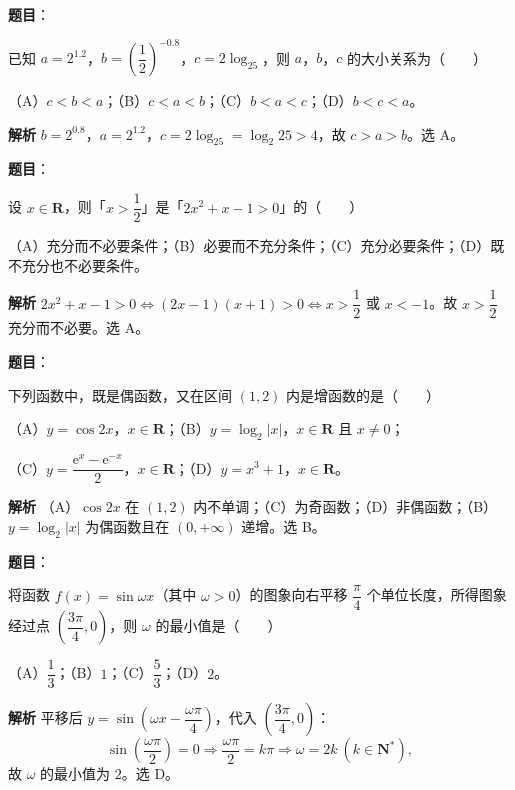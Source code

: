 \begin{answer}

\textbf{题目}：

已知 $a=2^{1.2}$，$b=\left(\dfrac12\right)^{-0.8}$，$c=2\log_25$，则 $a$，$b$，$c$ 的大小关系为\mbox{（　　）}

（A）$c<b<a$；（B）$c<a<b$；（C）$b<a<c$；（D）$b<c<a$。

\textbf{解析}
$b=2^{0.8}$，$a=2^{1.2}$，$c=2\log_25=\log_2 25>4$，故 $c>a>b$。选 A。


\end{answer}
\begin{answer}

\textbf{题目}：

设 $x\in\mathbf R$，则「$x>\dfrac12$」是「$2x^2+x-1>0$」的\mbox{（　　）}

（A）充分而不必要条件；（B）必要而不充分条件；（C）充分必要条件；（D）既不充分也不必要条件。

\textbf{解析}
$2x^2+x-1>0\iff(2x-1)(x+1)>0\iff x>\dfrac12$ 或 $x<-1$。故 $x>\dfrac12$ 充分而不必要。选 A。


\end{answer}
\begin{answer}

\textbf{题目}：

下列函数中，既是偶函数，又在区间 $(1,2)$ 内是增函数的是\mbox{（　　）}

（A）$y=\cos2x$，$x\in\mathbf R$；（B）$y=\log_2|x|$，$x\in\mathbf R$ 且 $x\neq0$；

（C）$y=\dfrac{\mathrm e^x-\mathrm e^{-x}}2$，$x\in\mathbf R$；（D）$y=x^3+1$，$x\in\mathbf R$。

\textbf{解析}
（A）$\cos2x$ 在 $(1,2)$ 内不单调；（C）为奇函数；（D）非偶函数；（B）$y=\log_2|x|$ 为偶函数且在 $(0,+\infty)$ 递增。选 B。


\end{answer}
\begin{answer}

\textbf{题目}：

将函数 $f(x)=\sin\omega x$（其中 $\omega>0$）的图象向右平移 $\dfrac\pi4$ 个单位长度，所得图象经过点 $\left(\dfrac{3\pi}4,0\right)$，则 $\omega$ 的最小值是\mbox{（　　）}

（A）$\dfrac13$；（B）$1$；（C）$\dfrac53$；（D）$2$。

\textbf{解析}
平移后 $y=\sin\left(\omega x-\dfrac{\omega\pi}4\right)$，代入 $\left(\dfrac{3\pi}4,0\right)$：
\nopagebreak[4]
\[\sin\left(\frac{\omega\pi}2\right)=0\Longrightarrow\frac{\omega\pi}2=k\pi\Longrightarrow\omega=2k\ (k\in\mathbf N^*),\]
故 $\omega$ 的最小值为 $2$。选 D。


\end{answer}
